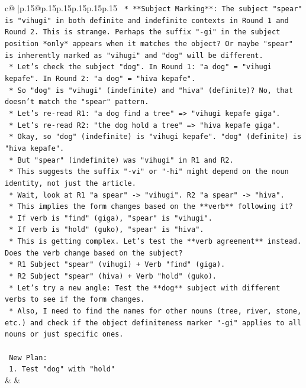 \documentclass{article}
\begin{document}
{\begin{supertabular}{c@{$\;$}|p{.15\linewidth}@{}p{.15\linewidth}p{.15\linewidth}p{.15\linewidth}p{.15\linewidth}p{.15\linewidth}}
{{{\texttt{    *   **Subject Marking**: The subject "spear" is "vihugi" in both definite and indefinite contexts in Round 1 and Round 2. This is strange. Perhaps the suffix "{-}gi" in the subject position *only* appears when it matches the object? Or maybe "spear" is inherently marked as "vihugi" and "dog" will be different.} \\
\texttt{    *   Let's check the subject "dog". In Round 1: "a dog" = "vihugi kepafe". In Round 2: "a dog" = "hiva kepafe".} \\
\texttt{    *   So "dog" is "vihugi" (indefinite) and "hiva" (definite)? No, that doesn't match the "spear" pattern.} \\
\texttt{    *   Let's re{-}read R1: "a dog find a tree" => "vihugi kepafe giga".} \\
\texttt{    *   Let's re{-}read R2: "the dog hold a tree" => "hiva kepafe giga".} \\
\texttt{    *   Okay, so "dog" (indefinite) is "vihugi kepafe". "dog" (definite) is "hiva kepafe".} \\
\texttt{    *   But "spear" (indefinite) was "vihugi" in R1 and R2.} \\
\texttt{    *   This suggests the suffix "{-}vi" or "{-}hi" might depend on the noun identity, not just the article.} \\
\texttt{    *   Wait, look at R1 "a spear" {-}> "vihugi". R2 "a spear" {-}> "hiva".} \\
\texttt{    *   This implies the form changes based on the **verb** following it?} \\
\texttt{        *   If verb is "find" (giga), "spear" is "vihugi".} \\
\texttt{        *   If verb is "hold" (guko), "spear" is "hiva".} \\
\texttt{    *   This is getting complex. Let's test the **verb agreement** instead. Does the verb change based on the subject?} \\
\texttt{        *   R1 Subject "spear" (vihugi) + Verb "find" (giga).} \\
\texttt{        *   R2 Subject "spear" (hiva) + Verb "hold" (guko).} \\
\texttt{    *   Let's try a new angle: Test the **dog** subject with different verbs to see if the form changes.} \\
\texttt{    *   Also, I need to find the names for other nouns (tree, river, stone, etc.) and check if the object definiteness marker "{-}gi" applies to all nouns or just specific ones.} \\
\\ 
\texttt{    New Plan:} \\
\texttt{    1.  Test "dog" with "hold"} \\
            }
        }
    }
    & & \\ \\


\end{supertabular}}
\end{document}

